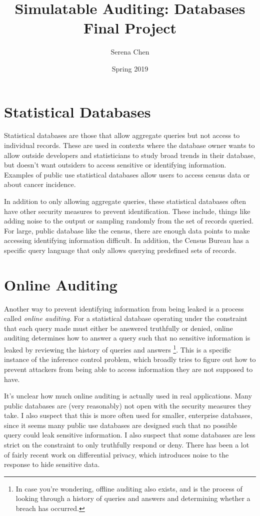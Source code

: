 \documentclass{article}
\title{Simulatable Auditing: Databases Final Project}
\author{Serena Chen}
\date{Spring 2019}
\begin{document}
\maketitle

\section{Statistical Databases}

Statistical databases are those that allow aggregate queries but not access to individual records.
These are used in contexts where the database owner wants to allow outside developers and statisticians to study broad trends in their database, but doesn't want outsiders to access sensitive or identifying information.
Examples of public use statistical databases allow users to access census data\cite{census} or about cancer incidence\cite{cancer}.

In addition to only allowing aggregate queries, these statistical databases often have other security measures to prevent identification. 
These include, things like adding noise to the output or sampling randomly from the set of records queried\cite{Shoshani:1982}.
For large, public database like the census, there are enough data points to make accessing identifying information difficult. 
In addition, the Census Bureau has a specific query language that only allows querying predefined sets of records.

\section{Online Auditing}

Another way to prevent identifying information from being leaked is a process called \textit{online auditing}. 
For a statistical database operating under the constraint that each query made must either be answered truthfully or denied, online auditing determines how to answer a query such that no sensitive information is leaked by reviewing the history of queries and answers
\footnote{In case you're wondering, offline auditing also exists, and is the process of looking through a history of queries and answers and determining whether a breach has occurred.}. 
This is a specific instance of the inference control problem, which broadly tries to figure out how to prevent attackers from being able to access information they are not supposed to have.

It's unclear how much online auditing is actually used in real applications.
Many public databases are (very reasonably) not open with the security measures they take.
I also suspect that this is more often used for smaller, enterprise databases, since it seems many public use databases are designed such that no possible query could leak sensitive information.
I also suspect that some databases are less strict on the constraint to only truthfully respond or deny.
There has been a lot of fairly recent work on differential privacy, which introduces noise to the response to hide sensitive data.
\end{document}
